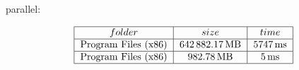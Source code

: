 \documentclass{article}
\begin{document}
    parallel:
    \begin{doublespacing}
      \begin{align*}
        \begin{tabular}{|*{3}{c|}}
          \hline
          $folder$ & $size$ & $time$ \\
          \hline
          Program Files (x86) & $\SI{642882.17}{\mega\byte}$ & $\SI{5747}{\milli\second}$ \\
          \hline
          Program Files (x86) & $\SI{982.78}{\mega\byte}$ & $\SI{5}{\milli\second}$ \\
          \hline
        \end{tabular}
      \end{align*}
    \end{doublespacing}
\end{document}
